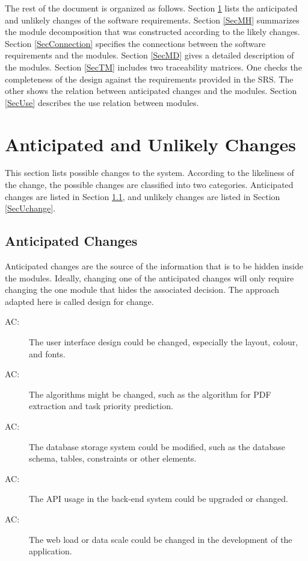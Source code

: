\documentclass[12pt, titlepage]{article}
\newcounter{acnum}
\newcommand{\actheacnum}{AC\theacnum}
\begin{document}
The rest of the document is organized as follows. Section
\ref{SecChange} lists the anticipated and unlikely changes of the software
requirements. Section \ref{SecMH} summarizes the module decomposition that
was constructed according to the likely changes. Section \ref{SecConnection}
specifies the connections between the software requirements and the
modules. Section \ref{SecMD} gives a detailed description of the
modules. Section \ref{SecTM} includes two traceability matrices. One checks
the completeness of the design against the requirements provided in the SRS. The
other shows the relation between anticipated changes and the modules. Section
\ref{SecUse} describes the use relation between modules.

\section{Anticipated and Unlikely Changes} \label{SecChange}

This section lists possible changes to the system. According to the likeliness
of the change, the possible changes are classified into two
categories. Anticipated changes are listed in Section \ref{SecAchange}, and
unlikely changes are listed in Section \ref{SecUchange}.

\subsection{Anticipated Changes} \label{SecAchange}

Anticipated changes are the source of the information that is to be hidden
inside the modules. Ideally, changing one of the anticipated changes will only
require changing the one module that hides the associated decision. The approach
adapted here is called design for
change.

\begin{description}
\item[ \actheacnum \label{acUI}:]
The user interface design could be changed, especially the layout, colour, and fonts.
\item[ \actheacnum \label{acALGM}:]
The algorithms might be changed, such as the algorithm for PDF extraction and task priority prediction.
\item[ \actheacnum \label{acDBSCH}:]
The database storage system could be modified, such as the database schema, tables, constraints or other elements.
\item[ \actheacnum \label{acAPI}:]
The API usage in the back-end system could be upgraded or changed.
\item[ \actheacnum \label{acSCALE}:]
The web load or data scale could be changed in the development of the application.

\end{description}
\end{document}
